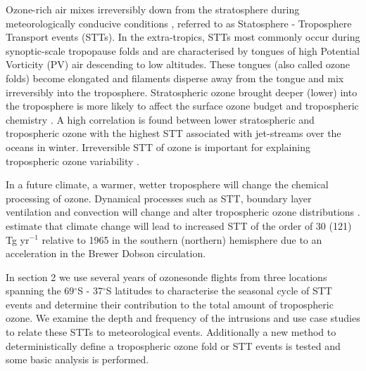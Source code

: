 \documentclass{article}
\begin{document}
    Ozone-rich air mixes irreversibly down from the stratosphere during meteorologically conducive conditions \citep{Sprenger2003,Mihalikova2012}, referred to as Statosphere - Troposphere Transport events (STTs).
    In the extra-tropics, STTs most commonly occur during synoptic-scale tropopause folds \citep{Sprenger2003, Tang2012} and are characterised by tongues of high Potential Vorticity (PV) air descending to low altitudes.
    These tongues (also called ozone folds) become elongated and filaments disperse away from the tongue and mix irreversibly into the troposphere.
    Stratospheric ozone brought deeper (lower) into the troposphere is more likely to affect the surface ozone budget and tropospheric chemistry \citep{Zanis2003,Zhang_2014}.
    A high correlation is found between lower stratospheric and tropospheric ozone \citep{Terao_2008} with the highest STT associated with jet-streams over the oceans in winter.
    Irreversible STT of ozone is important for explaining tropospheric ozone variability \citep{Tang2012}.

    
    In a future climate, a warmer, wetter troposphere will change the chemical processing of ozone. Dynamical processes such as STT, boundary layer ventilation and convection will change and alter tropospheric ozone distributions \citep{Hegglin_2009}.
    \citet{Hegglin_2009} estimate that climate change will lead to increased STT of the order of 30 (121) Tg yr$^{-1}$ relative to 1965 in the southern (northern) hemisphere due to an acceleration in the Brewer Dobson circulation. 


    In section 2 we use several years of ozonesonde flights from three locations spanning the 69$^{\circ}$S - 37$^{\circ}$S latitudes to characterise the seasonal cycle of STT events and determine their contribution to the total amount of tropospheric ozone.
    We examine the depth and frequency of the intrusions and use case studies to relate these STTs to meteorological events.
    Additionally a new method to deterministically define a tropospheric ozone fold or STT events is tested and some basic analysis is performed.
\end{document}
